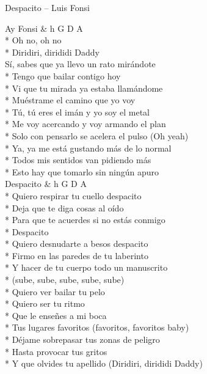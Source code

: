 \begin{piosenka_dluga}{Despacito -- Luis Fonsi}

Ay Fonsi & h G D A \\*
Oh no, oh no \\*
Diridiri, dirididi Daddy \\[\zwrotkaspace]

Sí, sabes que ya llevo un rato mirándote \\*
Tengo que bailar contigo hoy \\*
Vi que tu mirada ya estaba llamándome \\*
Muéstrame el camino que yo voy \\*
Tú, tú eres el imán y yo soy el metal \\*
Me voy acercando y voy armando el plan \\*
Solo con pensarlo se acelera el pulso (Oh yeah) \\*
Ya, ya me está gustando más de lo normal \\*
Todos mis sentidos van pidiendo más \\*
Esto hay que tomarlo sin ningún apuro \\[\zwrotkaspace]

 Despacito & h G D A \\*
 Quiero respirar tu cuello despacito \\*
 Deja que te diga cosas al oído \\*
 Para que te acuerdes si no estás conmigo \\*
 Despacito \\*
 Quiero desnudarte a besos despacito \\*
 Firmo en las paredes de tu laberinto \\*
 Y hacer de tu cuerpo todo un manuscrito \\*
 \hspace{20mm} (sube, sube, sube, sube, sube) \\*
 Quiero ver bailar tu pelo \\*
 Quiero ser tu ritmo \\*
 Que le enseñes a mi boca \\*
 Tus lugares favoritos (favoritos, favoritos baby) \\*
 Déjame sobrepasar tus zonas de peligro \\*
 Hasta provocar tus gritos \\*
 Y que olvides tu apellido (Diridiri, dirididi Daddy) \\[\zwrotkaspace]


\end{piosenka_dluga}
